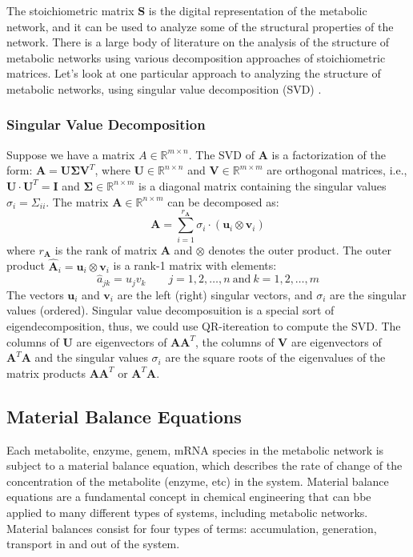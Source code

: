 \documentclass{article}[11pt]
\def\R{\mathbb{R}}
\begin{document}
The stoichiometric matrix $\mathbf{S}$ is the digital representation of the metabolic network, and it can be used to analyze some of the structural properties of the network.
There is a large body of literature on the analysis of the structure of metabolic networks using various decomposition approaches of stoichiometric matrices. 
Let's look at one particular approach to analyzing the structure of metabolic networks, using singular value decomposition (SVD) \cite{Famili:2003aa}.

\subsubsection*{Singular Value Decomposition}
Suppose we have a matrix $A \in \R^{m \times n}$. The SVD of $\mathbf{A}$ is a factorization of the form: $\mathbf{A} = \mathbf{U}\mathbf{\Sigma}\mathbf{V}^{T}$, where
$\mathbf{U}\in\mathbb{R}^{n\times{n}}$ and $\mathbf{V}\in\mathbb{R}^{m\times{m}}$ are orthogonal matrices, i.e., $\mathbf{U}\cdot\mathbf{U}^{T} = \mathbf{I}$ and $\mathbf{\Sigma}\in\mathbb{R}^{n\times{m}}$ is a diagonal matrix containing 
the singular values $\sigma_{i}=\Sigma_{ii}$. The matrix $\mathbf{A}\in\mathbb{R}^{n\times{m}}$ can be decomposed as:
\begin{equation*}
\mathbf{A} = \sum_{i=1}^{r_{\mathbf{A}}}\sigma_{i}\cdot\left(\mathbf{u}_{i}\otimes\mathbf{v}_{i}\right)
\end{equation*}
where $r_{\mathbf{A}}$ is the rank of matrix $\mathbf{A}$ and $\otimes$ denotes the outer product. 
The outer product $\hat{\mathbf{A}}_{i} = \mathbf{u}_{i}\otimes\mathbf{v}_{i}$ is a rank-1 matrix with elements: 
\begin{equation*}
\hat{a}_{jk} = u_{j}v_{k}\qquad{j=1,2,\dots,n~\text{and}~k=1,2,\dots,m}
\end{equation*}
The vectors $\mathbf{u}_{i}$ and $\mathbf{v}_{i}$ are the left (right) singular vectors, 
and $\sigma_{i}$ are the singular values (ordered). Singular value decomposuition is a special sort of eigendecomposition, thus, we could use QR-itereation to compute the SVD.
The columns of $\mathbf{U}$ are eigenvectors of $\mathbf{A}\mathbf{A}^{T}$, 
the columns of $\mathbf{V}$ are eigenvectors of $\mathbf{A}^{T}\mathbf{A}$ and
the singular values $\sigma_{i}$ are the square roots of the eigenvalues of the matrix products $\mathbf{A}\mathbf{A}^{T}$ or $\mathbf{A}^{T}\mathbf{A}$. 

\subsection{Material Balance Equations}
Each metabolite, enzyme, genem, mRNA species in the metabolic network is subject to a material balance equation, which describes the rate of change of the concentration of the metabolite (enzyme, etc) in the system.
Material balance equations are a fundamental concept in chemical engineering that can bbe applied to many different types of systems, including metabolic networks.
Material balances consist for four types of terms: accumulation, generation, transport in and out of the system.
\end{document}
